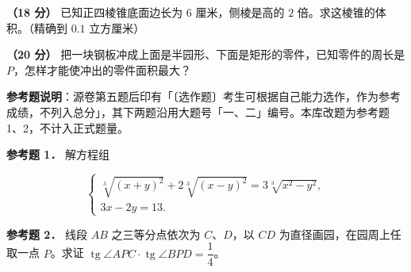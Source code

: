 \begin{question}
\textbf{（18 分）} 已知正四棱锥底面边长为 $6$ 厘米，侧棱是高的 $2$ 倍。求这棱锥的体积。（精确到 $0.1$ 立方厘米）
\nopagebreak[4]
\begin{center}\end{center}
\nopagebreak[4]
\Needspace{0.4\textheight}
\end{question}
\begin{question}
\textbf{（20 分）} 把一块钢板冲成上面是半园形、下面是矩形的零件，已知零件的周长是 $P$，怎样才能使冲出的零件面积最大？
\nopagebreak[4]
\begin{center}\end{center}
\nopagebreak[4]
\begin{gktip}
\textbf{参考题说明}：源卷第五题后印有「〔选作题〕考生可根据自己能力选作，作为参考成绩，不列入总分」，其下两题沿用大题号「一、二」编号。本库改题为参考题 1、2，不计入正式题量。
\end{gktip}

\textbf{参考题 1．} 解方程组

\nopagebreak[4]
\[
\begin{cases}
\sqrt[3]{(x+y)^2}+2\sqrt[3]{(x-y)^2}=3\sqrt[3]{x^2-y^2},\\
3x-2y=13.
\end{cases}
\]

\textbf{参考题 2．} 线段 $AB$ 之三等分点依次为 $C\text{、}D$，以 $CD$ 为直径画园，在园周上任取一点 $P$。求证 $\operatorname{tg}\angle APC\cdot\operatorname{tg}\angle BPD=\dfrac14$。
\nopagebreak[4]
\begin{center}\end{center}
\nopagebreak[4]

\end{question}